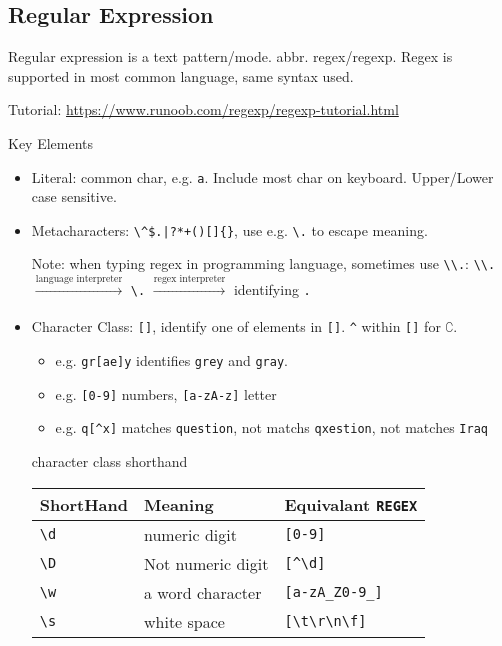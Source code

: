 \subsection{Regular Expression}
    Regular expression is a text pattern/mode. abbr. regex/regexp. Regex is supported in most common language, same syntax used.

    Tutorial: \url{https://www.runoob.com/regexp/regexp-tutorial.html}

\begin{point}
    Key Elements
\end{point}

\begin{itemize}[topsep=2pt,itemsep=0pt]
    \item Literal: common char, e.g. \lstinline|a|. Include most char on keyboard. Upper/Lower case sensitive.
    \item Metacharacters: \lstinline!\^$.|?*+()[]{}!, use e.g. \lstinline|\.| to escape meaning.
    
    Note: when typing regex in programming language, sometimes use \lstinline|\\.|: \lstinline|\\.| $ \xrightarrow[]{\text{language interpreter}}  $ \lstinline|\.| $ \xrightarrow[]{\text{regex interpreter}}  $ identifying \lstinline|.|

    \item Character Class: \lstinline|[]|, identify one of elements in \lstinline|[]|. \lstinline|^| within \lstinline|[]| for $ \complement $. 
    \begin{itemize}[topsep=2pt,itemsep=0pt]
        \item e.g. \lstinline|gr[ae]y| identifies \lstinline|grey| and \lstinline|gray|.
        \item e.g. \lstinline|[0-9]| numbers, \lstinline|[a-zA-z]| letter
        \item e.g. \lstinline|q[^x]| matches \lstinline|question|, not matchs \lstinline|qxestion|, not matches \lstinline|Iraq|
    \end{itemize}

    character class shorthand
\begin{table}[H]
    \centering
    \renewcommand\arraystretch{1.15}
    \begin{tabular}{lll}
        \hline
        ShortHand&Meaning&Equivalant \lstinline|REGEX|\\
        \hline
        \lstinline|\d|&numeric digit&\lstinline|[0-9]|\\
        \lstinline|\D|&Not numeric digit&\lstinline|[^\d]|\\
        \lstinline|\w|&a word character&\lstinline|[a-zA_Z0-9_]|\\
        \lstinline|\s|&white space&\lstinline|[\t\r\n\f]|\\
        \hline
    \end{tabular}
\end{table}


\end{itemize}
